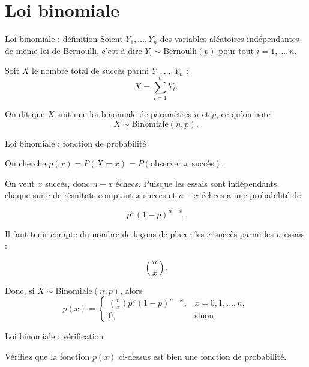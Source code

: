 \documentclass{BeamerTemplate}
\begin{document}
\section{Loi binomiale}

\begin{frame}[t]{Loi binomiale : définition}
Soient $Y_1,\ldots,Y_n$ des variables aléatoires indépendantes de même loi de Bernoulli, c'est-à-dire $Y_i\sim \text{Bernoulli}(p)$ pour tout $i = 1,\ldots,n$.

\medskip

Soit $X$ le nombre total de succès parmi $Y_1,\ldots,Y_n$ :
$$X=\sum_{i=1}^nY_i.$$

\medskip
On dit que $X$ suit une loi binomiale de paramètres $n$ et $p$, ce qu'on note
$$X\sim \mbox{Binomiale}(n,p).$$
\end{frame}

\begin{frame}{Loi binomiale : fonction de probabilité}

{\small

On cherche $p(x) = P(X = x) = P(\mbox{observer $x$ succès}).$

\vspace{0.1 in}
On veut $x$ succès, donc $n-x$ échecs. Puisque les essais sont indépendants, chaque suite de résultats comptant $x$ succès et $n-x$ échecs a une probabilité de

$$ p^x (1-p)^{n-x}.$$

Il faut tenir compte du nombre de façons de placer les $x$ succès parmi les $n$ essais :

$$\displaystyle \binom{n}{x}.$$

Donc, si $X\sim \text{Binomiale}(n,p)$, alors
$$p(x)=\left\{\begin{array}{ll}
{n\choose x}p^x(1-p)^{n-x}, & x=0,1,\ldots,n,\\
0, & \text{sinon}.
\end{array}\right.$$

}

\end{frame}


\begin{frame}{Loi binomiale : vérification}

Vérifiez que la fonction $p(x)$ ci-dessus est bien une fonction de probabilité.

\end{frame}
\end{document}
